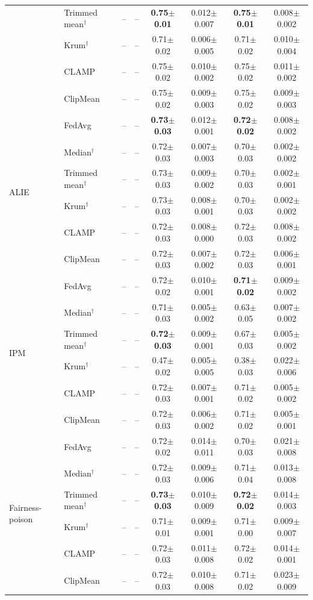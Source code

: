 \begin{table}[tbp]
\begin{tabular}{llcccccc}
 & Trimmed mean$^\dagger$ & -- & -- & \textbf{0.75$\pm$0.01} & 0.012$\pm$0.007 & \textbf{0.75$\pm$0.01} & 0.008$\pm$0.002 \\
 & Krum$^\dagger$ & -- & -- & 0.71$\pm$0.02 & 0.006$\pm$0.005 & 0.71$\pm$0.02 & 0.010$\pm$0.004 \\
 & CLAMP & -- & -- & 0.75$\pm$0.02 & 0.010$\pm$0.002 & 0.75$\pm$0.02 & 0.011$\pm$0.002 \\
 & ClipMean & -- & -- & 0.75$\pm$0.02 & 0.009$\pm$0.003 & 0.75$\pm$0.02 & 0.009$\pm$0.003 \\
\midrule
\multirow{6}{*}{ALIE} & FedAvg & -- & -- & \textbf{0.73$\pm$0.03} & 0.012$\pm$0.001 & \textbf{0.72$\pm$0.02} & 0.008$\pm$0.002 \\
 & Median$^\dagger$ & -- & -- & 0.72$\pm$0.03 & 0.007$\pm$0.003 & 0.70$\pm$0.03 & 0.002$\pm$0.002 \\
 & Trimmed mean$^\dagger$ & -- & -- & 0.73$\pm$0.03 & 0.009$\pm$0.002 & 0.70$\pm$0.03 & 0.002$\pm$0.001 \\
 & Krum$^\dagger$ & -- & -- & 0.73$\pm$0.03 & 0.008$\pm$0.001 & 0.70$\pm$0.03 & 0.002$\pm$0.002 \\
 & CLAMP & -- & -- & 0.72$\pm$0.03 & 0.008$\pm$0.000 & 0.72$\pm$0.03 & 0.008$\pm$0.002 \\
 & ClipMean & -- & -- & 0.72$\pm$0.03 & 0.007$\pm$0.002 & 0.72$\pm$0.03 & 0.006$\pm$0.001 \\
\midrule
\multirow{6}{*}{IPM} & FedAvg & -- & -- & 0.72$\pm$0.02 & 0.010$\pm$0.001 & \textbf{0.71$\pm$0.02} & 0.009$\pm$0.002 \\
 & Median$^\dagger$ & -- & -- & 0.71$\pm$0.03 & 0.005$\pm$0.002 & 0.63$\pm$0.05 & 0.007$\pm$0.002 \\
 & Trimmed mean$^\dagger$ & -- & -- & \textbf{0.72$\pm$0.03} & 0.009$\pm$0.001 & 0.67$\pm$0.03 & 0.005$\pm$0.002 \\
 & Krum$^\dagger$ & -- & -- & 0.47$\pm$0.02 & 0.005$\pm$0.005 & 0.38$\pm$0.03 & 0.022$\pm$0.006 \\
 & CLAMP & -- & -- & 0.72$\pm$0.03 & 0.007$\pm$0.001 & 0.71$\pm$0.02 & 0.005$\pm$0.002 \\
 & ClipMean & -- & -- & 0.72$\pm$0.03 & 0.006$\pm$0.002 & 0.71$\pm$0.02 & 0.005$\pm$0.001 \\
\midrule
\multirow{6}{*}{Fairness-poison} & FedAvg & -- & -- & 0.72$\pm$0.02 & 0.014$\pm$0.011 & 0.70$\pm$0.03 & 0.021$\pm$0.008 \\
 & Median$^\dagger$ & -- & -- & 0.72$\pm$0.03 & 0.009$\pm$0.006 & 0.71$\pm$0.04 & 0.013$\pm$0.008 \\
 & Trimmed mean$^\dagger$ & -- & -- & \textbf{0.73$\pm$0.03} & 0.010$\pm$0.009 & \textbf{0.72$\pm$0.02} & 0.014$\pm$0.003 \\
 & Krum$^\dagger$ & -- & -- & 0.71$\pm$0.01 & 0.009$\pm$0.001 & 0.71$\pm$0.00 & 0.009$\pm$0.007 \\
 & CLAMP & -- & -- & 0.72$\pm$0.03 & 0.011$\pm$0.008 & 0.72$\pm$0.02 & 0.014$\pm$0.001 \\
 & ClipMean & -- & -- & 0.72$\pm$0.03 & 0.010$\pm$0.008 & 0.71$\pm$0.02 & 0.023$\pm$0.009 \\
\bottomrule
\end{tabular}
\end{table}
